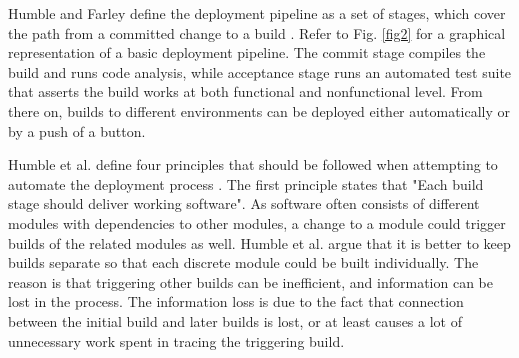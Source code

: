 \documentclass[english]{tktltiki2}
\theoremstyle{definition}
\theoremstyle{remark}
\begin{document}
Humble and Farley define the deployment pipeline as a set of stages, which cover the path from a committed change to a build \cite{cdbook}. Refer to Fig. \ref{fig2} for a graphical representation of a basic deployment pipeline. The commit stage compiles the build and runs code analysis, while acceptance stage runs an automated test suite that asserts the build works at both functional and nonfunctional level. From there on, builds to different environments can be deployed either automatically or by a push of a button.

Humble et al. define four principles that should be followed when attempting to automate the deployment process \cite{humble2006deployment}. The first principle states that "Each build stage should deliver working software". As software often consists of different modules with dependencies to other modules, a change to a module could trigger builds of the related modules as well. Humble et al. argue that it is better to keep builds separate so that each discrete module could be built individually. The reason is that triggering other builds can be inefficient, and information can be lost in the process. The information loss is due to the fact that connection between the initial build and later builds is lost, or at least causes a lot of unnecessary work spent in tracing the triggering build. 
\end{document}

